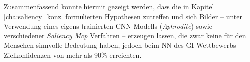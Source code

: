 Zusammenfassend konnte hiermit gezeigt werden, dass die in Kapitel \ref{cha:saliency_konz} formulierten Hypothesen zutreffen und sich Bilder – unter Verwendung eines eigens trainierten \ac{CNN} Modells (\textit{Aphrodite}) sowie verschiedener \textit{Saliency Map} Verfahren – erzeugen lassen, die zwar keine für den Menschen sinnvolle Bedeutung haben, jedoch beim \ac{NN} des \ac{GI}-Wettbewerbs Zielkonfidenzen von mehr als 90\% erreichten.


